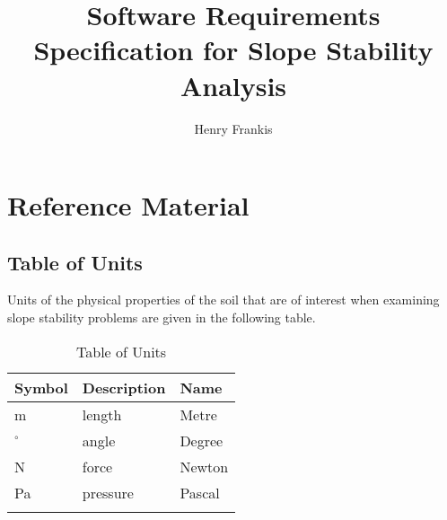 \documentclass[12pt]{article}
\title{Software Requirements Specification for Slope Stability Analysis}
\author{Henry Frankis}
\begin{document}
\maketitle
\tableofcontents
\newpage
\section{Reference Material}
\label{Sec:RM}
\subsection{Table of Units}
\label{Sec:ToU}
Units of the physical properties of the soil that are of interest when examining slope stability problems are given in the following table.
\begin{longtable}{l l l}
\toprule
Symbol & Description & Name
\\
\midrule
m & length & Metre
\\
${}^{\circ}$ & angle & Degree
\\
N & force & Newton
\\
Pa & pressure & Pascal
\\
\bottomrule
\caption{Table of Units}
\label{Table:ToU}
\end{longtable}
\end{document}
